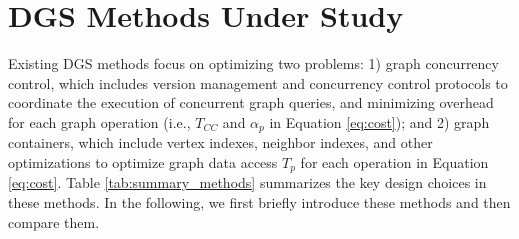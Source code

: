 \section{DGS Methods Under Study}\label{sec:dgs_methods_under_study}

 
Existing DGS methods focus on optimizing two problems: 1) graph concurrency control, which includes version management and concurrency control protocols to coordinate the execution of concurrent graph queries, and minimizing overhead for each graph operation (i.e., $T_{CC}$ and $\alpha_p$ in Equation \ref{eq:cost}); and 2) graph containers, which include vertex indexes, neighbor indexes, and other optimizations to optimize graph data access $T_p$ for each operation in Equation \ref{eq:cost}. Table \ref{tab:summary_methods} summarizes the key design choices in these methods. In the following, we first briefly introduce these methods and then compare them.

